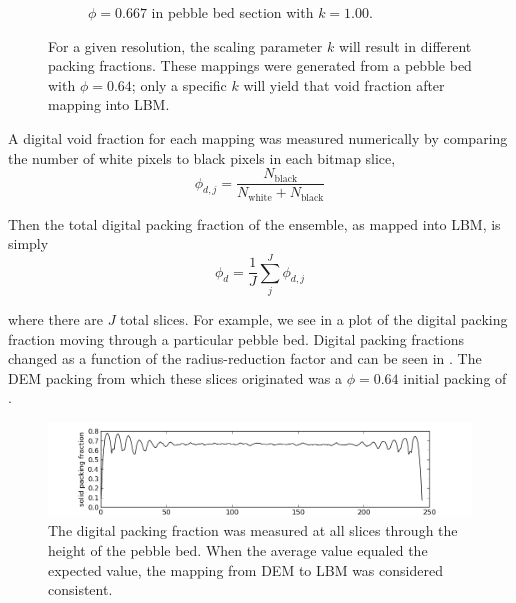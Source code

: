 \begin{figure}[ht]
\begin{subfigure}[b]{0.2\textwidth}
                \caption{$\phi = 0.667$ in pebble bed section with $k = 1.00$.}
                \label{fig:2d-res20-k100}
        \end{subfigure}
        \caption{For a given resolution, the scaling parameter $k$ will result in different packing fractions. These mappings were generated from a pebble bed with $\phi =0.64$; only a specific $k$ will yield that void fraction after mapping into LBM.}\label{fig:2d-dem-lbm-mapping}
\end{figure}


A digital void fraction for each mapping was measured numerically by comparing the number of white pixels to black pixels in each bitmap slice,
\begin{equation}
	\phi_{d,j} = \frac{N_\text{black}}{N_\text{white}+N_\text{black}}
\end{equation}

Then the total digital packing fraction of the ensemble, as mapped into LBM, is simply
\begin{equation}
	\phi_d = \frac{1}{J}\sum_j^J\phi_{d,j}
\end{equation}

where there are $J$ total slices. For example, we see in  a plot of the digital packing fraction moving through a particular pebble bed. Digital packing fractions changed as a function of the radius-reduction factor and can be seen in . The DEM packing from which these slices originated was a $\phi =0.64$ initial packing of .

\begin{figure}[h]
	\centering
	\includegraphics[width=\textwidth]{figures/lbm/palabos_packing_fraction}
	\caption{The digital packing fraction was measured at all slices through the height of the pebble bed. When the average value equaled the expected value, the mapping from DEM to LBM was considered consistent.}\label{fig:dem-2-lbm-packing-fraction}
\end{figure}







